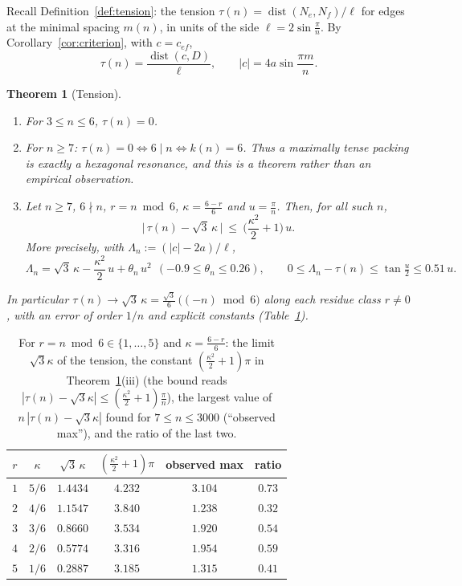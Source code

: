 \documentclass[11pt,a4paper]{article}
\newtheorem{theorem}{Theorem}[section]
\theoremstyle{definition}
\theoremstyle{remark}
\DeclareMathOperator{\dist}{dist}
\begin{document}
Recall Definition~\ref{def:tension}: the tension $\tau(n)=\dist(N_e,N_f)/\ell$ for edges at the minimal spacing $m(n)$, in units of the side $\ell=2\sin\frac\pi n$. By Corollary~\ref{cor:criterion}, with $c=c_{ef}$,
\begin{equation}\label{eq:tau}
\tau(n)=\frac{\dist(c,D)}{\ell},\qquad|c|=4a\sin\frac{\pi m}n .
\end{equation}

\begin{theorem}[Tension]\label{thm:tension}
\begin{enumerate}[label=(\roman*),nosep]
\item For $3\le n\le6$, $\tau(n)=0$.
\item For $n\ge7$: $\tau(n)=0\iff6\mid n\iff k(n)=6$. Thus a maximally tense packing is exactly a hexagonal resonance, and this is a theorem rather than an empirical observation.
\item Let $n\ge7$, $6\nmid n$, $r=n\bmod6$, $\kappa=\frac{6-r}{6}$ and $u=\frac\pi n$. Then, for all such $n$,
\[
\Big|\,\tau(n)-\sqrt3\,\kappa\,\Big|\ \le\ \Big(\frac{\kappa^2}{2}+1\Big)\,u .
\]
More precisely, with $\Lambda_n:=(|c|-2a)/\ell$,
\[
\Lambda_n=\sqrt3\,\kappa-\frac{\kappa^2}{2}\,u+\theta_n\,u^2\ \ (-0.9\le\theta_n\le0.26),\qquad 0\le\Lambda_n-\tau(n)\le\tan\tfrac u2\le0.51\,u .
\]
\end{enumerate}
In particular $\tau(n)\to\sqrt3\,\kappa=\frac{\sqrt3}{6}\,\big((-n)\bmod6\big)$ along each residue class $r\ne0$, with an error of order $1/n$ and explicit constants (Table~\ref{tab:tension}).
\end{theorem}

\begin{table}[ht]
\centering\small
\begin{tabular}{cccccc}
\toprule
$r$ & $\kappa$ & $\sqrt3\,\kappa$ & $(\frac{\kappa^2}2+1)\pi$ & observed max & ratio\\
\midrule
$1$ & $5/6$ & $1.4434$ & $4.232$ & $3.104$ & $0.73$ \\
$2$ & $4/6$ & $1.1547$ & $3.840$ & $1.238$ & $0.32$ \\
$3$ & $3/6$ & $0.8660$ & $3.534$ & $1.920$ & $0.54$ \\
$4$ & $2/6$ & $0.5774$ & $3.316$ & $1.954$ & $0.59$ \\
$5$ & $1/6$ & $0.2887$ & $3.185$ & $1.315$ & $0.41$ \\
\bottomrule
\end{tabular}
\caption{For $r=n\bmod6\in\{1,\dots,5\}$ and $\kappa=\frac{6-r}6$: the limit $\sqrt3\kappa$ of the tension, the constant $(\frac{\kappa^2}2+1)\pi$ in Theorem~\ref{thm:tension}(iii) (the bound reads $|\tau(n)-\sqrt3\kappa|\le(\frac{\kappa^2}2+1)\frac\pi n$), the largest value of $n\,|\tau(n)-\sqrt3\kappa|$ found for $7\le n\le3000$ (``observed max''), and the ratio of the last two.}\label{tab:tension}
\end{table}
\end{document}
